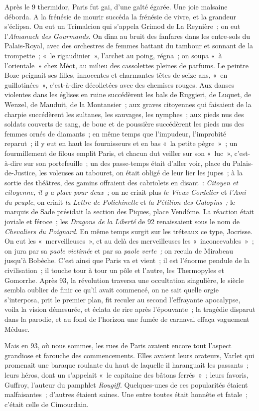 \documentclass[french,twoside]{book} %
\begin{document}
Après le 9 thermidor, Paris fut gai, d’une gaîté égarée. Une joie malsaine déborda. A la frénésie de mourir succéda la frénésie de vivre, et la grandeur s’éclipsa. On eut un Trimalcion qui s’appela Grimod de La Reynière ; on eut l’\emph{Almanach des Gourmands}. On dîna au bruit des fanfares dans les entre-sols du Palais-Royal, avec des orchestres de femmes battant du tambour et sonnant de la trompette ; « le rigaudinier », l’archet au poing, régna ; on soupa « à l’orientale » chez Méot, au milieu des cassolettes pleines de parfums. Le peintre Boze peignait ses filles, innocentes et charmantes têtes de seize ans, « en guillotinées »,  c’est-à-dire décolletées avec des chemises rouges. Aux danses violentes dans les églises en ruine succédèrent les bals de Ruggieri, de Luquet, de Wenzel, de Mauduit, de la Montansier ; aux graves citoyennes qui faisaient de la charpie succédèrent les sultanes, les sauvages, les nymphes ; aux pieds nus des soldats couverts de sang, de boue et de poussière succédèrent les pieds nus des femmes ornés de diamants ; en même temps que l’impudeur, l’improbité reparut ; il y eut en haut les fournisseurs et en bas « la petite pègre » ; un fourmillement de filous emplit Paris, et chacun dut veiller sur son « luc », c’est-à-dire sur son portefeuille ; un des passe-temps était d’aller voir, place du Palais-de-Justice, les voleuses au tabouret, on était obligé de leur lier les jupes ; à la sortie des théâtres, des gamins offraient des cabriolets en disant : \emph{Citoyen et citoyenne, il y a place pour deux ;} on ne criait plus \emph{le Vieux Cordelier} et \emph{l’Ami du peuple}, on criait \emph{la Lettre de Polichinelle} et \emph{la Pétition des Galopins ;} le marquis de Sade présidait la section des Piques, place Vendôme. La réaction était joviale et féroce ; les \emph{Dragons de la Liberté} de 92 renaissaient sous le nom de \emph{Chevaliers du Poignard}. En même temps surgit sur les tréteaux ce type, Jocrisse. On eut les « merveilleuses », et au delà des merveilleuses les « inconcevables » ; on jura par sa \emph{paole victimée} et par sa \emph{paole verte ;} on recula de Mirabeau jusqu’à Bobèche. C’est ainsi que Paris va et vient ; il est l’énorme pendule de la civilisation ; il touche tour à tour un pôle et l’autre, les Thermopyles et Gomorrhe. Après 93, la révolution traversa  une occultation singulière, le siècle sembla oublier de finir ce qu’il avait commencé, on ne sait quelle orgie s’interposa, prit le premier plan, fit reculer au second l’effrayante apocalypse, voila la vision démesurée, et éclata de rire après l’épouvante ; la tragédie disparut dans la parodie, et au fond de l’horizon une fumée de carnaval effaça vaguement Méduse.\par
Mais en 93, où nous sommes, les rues de Paris avaient encore tout l’aspect grandiose et farouche des commencements. Elles avaient leurs orateurs, Varlet qui promenait une baraque roulante du haut de laquelle il haranguait les passants ; leurs héros, dont un s’appelait « le capitaine des bâtons ferrés » ; leurs favoris, Guffroy, l’auteur du pamphlet \emph{Rougiff}. Quelques-unes de ces popularités étaient malfaisantes ; d’autres étaient saines. Une entre toutes était honnête et fatale ; c’était celle de Cimourdain.
\end{document}
